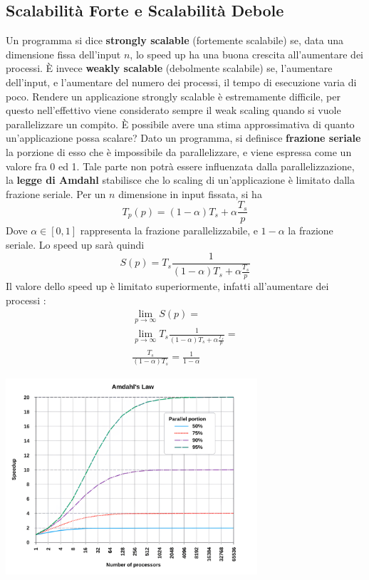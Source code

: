 \documentclass[10pt, letterpaper]{report}
\begin{document}
\subsection{Scalabilità Forte e Scalabilità Debole}
Un programma si dice \textbf{strongly scalable} (fortemente scalabile) se, data una dimensione 
fissa dell'input $n$,  lo speed up ha una buona crescita all'aumentare dei processi. È invece 
\textbf{weakly scalable} (debolmente scalabile) se, l'aumentare dell'input, e l'aumentare del numero dei processi, 
il tempo di esecuzione varia di poco.\acc 
Rendere un applicazione strongly scalable è estremamente difficile, per questo nell'effettivo viene considerato 
sempre il weak scaling quando si vuole parallelizzare un compito. È possibile avere una stima approssimativa
 di quanto un'applicazione possa scalare? Dato un programma, si definisce \textbf{frazione seriale} 
 la porzione di esso che è impossibile da parallelizzare, e viene espressa come un valore fra 0 ed 1. 
 Tale parte non potrà essere influenzata dalla parallelizzazione, la \textbf{legge di Amdahl} stabilisce che lo 
 scaling di un'applicazione è limitato dalla frazione seriale. Per un $n$ dimensione in input fissata, si ha
 $$ T_p(p)=(1-\alpha)T_s+\alpha\frac{T_s}{p}$$
 Dove $\alpha\in[0,1]$ rappresenta la frazione parallelizzabile, e $1-\alpha$ la frazione seriale. Lo speed up 
 sarà quindi 
 $$ S(p)=T_s\frac{1}{(1-\alpha)T_s+\alpha\frac{T_s}{p}}$$
 Il valore dello speed up è limitato superiormente, infatti all'aumentare dei processi :
\begin{eqnarray}
    \lim_{p\rightarrow\infty}S(p) = \\ 
    \lim_{p\rightarrow\infty}T_s\frac{1}{(1-\alpha)T_s+\alpha\frac{T_s}{p}} = \\ 
    \frac{T_s}{(1-\alpha)T_s}=\frac{1}{1-\alpha}
\end{eqnarray}\begin{center}
    \includegraphics[width=0.7\textwidth]{images/Amdahls.png}
\end{center}
\end{document}
